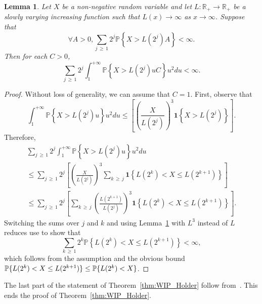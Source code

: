 \documentclass[10pt]{amsart}
\newtheorem{lemm}[theo]{Lemma}\newtheorem{prop}[theo]{Proposition}\newtheorem{coro}[theo]{Corollary}\newtheorem{conj}[theo]{Conjecture}
\theoremstyle{definition}\newtheorem{defi}[theo]{Definition}\newtheorem{rema}[theo]{Remark}\newtheorem{exam}[theo]{Example}\newtheorem{exem}[theo]{Example}\newtheorem{nota}[theo]{Notation}
\newcommand{\bfun}{\mathbf{1}}
\newcommand\R{\mathbb{R}}
\newcommand\PP{\mathbb{P}}
\newcommand{\pr}[1]{(#1)}
\let\oldforall\forall
\renewcommand*{\forall}{\mathrel{\oldforall}}
\begin{document}
\begin{lemm}\label{lem:slowly_varying}
Let $X$ be a non-negative random variable and let $L\colon \R_{+}\to \R_{+}$ be a slowly varying increasing function such that $L\pr{x}\to \infty$ as $x\to \infty$. Suppose that
\begin{equation}
\forall A>0, \sum_{j\,\geq\,1}2^j\PP\left\{X>L\left(2^j\right)A\right\}<\infty.
\end{equation}
Then for each $C>0$,
\begin{equation}
\sum_{j\,\geq\,1}2^j\int_1^{+\infty}\PP\left\{X>L\left(2^j\right)uC\right\} u^{2}du<\infty.
\end{equation}
\end{lemm}
\begin{proof}
Without loss of generality, we can assume that $C=1$. First, observe that
\begin{equation}
\int_1^{+\infty}\PP\left\{X>L\left(2^j\right)u\right\} u^{2}du\leq \left[\left(\frac{X}{L\left(2^j\right)}\right)^{3}\bfun\left\{X>L\left(2^j\right) \right\}\right].
\end{equation}
Therefore,
\begin{multline}
\sum_{j\,\geq\,1}2^j\int_1^{+\infty}\PP\left\{X>L\left(2^j\right)u\right\} u^{2}du \\
\leq \sum_{j\,\geq\,1}2^j\left[\left(\frac{X}{L\left(2^j\right)}\right)^{3}\sum_{k\,\geq\,j}\bfun\left\{ L\left(2^k\right)<X\leq L\left(2^{k+1}\right) \right\}\right]\\
\leq \sum_{j\,\geq\,1}2^j\left[\sum_{k\,\geq\,j}\left(\frac{L\left(2^{k+1}\right) }{L\left(2^j\right)}\right)^{3}\bfun\left\{ L\left(2^k\right)<X\leq L\left(2^{k+1}\right) \right\}\right].
\end{multline}
Switching the sums over $j$ and $k$ and using Lemma~\ref{lem:slowly_varying} with $L^3$ instead of $L$ reduces use to show that
\begin{equation}
\sum_{k\,\geq\,1} 2^k\PP\left\{ L\left(2^k\right)<X\leq L\left(2^{k+1}\right) \right\}<\infty,
\end{equation}
which follows from the assumption and the obvious bound $\PP\{ L\pr{2^k}<X\leq L\pr{2^{k+1}} \} \linebreak\leq
\PP\{ L\pr{2^k}<X \}$.
\end{proof}



The last part of the statement of Theorem~\ref{thm:WIP_Holder} follow from~\cite{MR3913270}. This ends the proof of Theorem~\ref{thm:WIP_Holder}.
\end{document}
